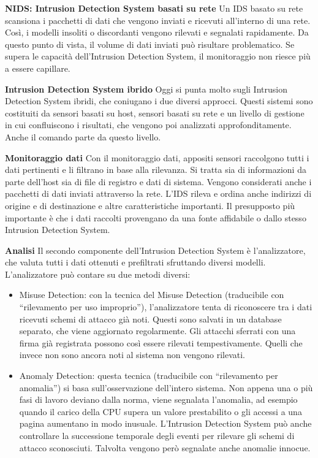 \textbf{NIDS: Intrusion Detection System basati su rete}
Un IDS basato su rete scansiona i pacchetti di dati che vengono inviati e ricevuti all’interno di una rete. Così, i modelli insoliti o discordanti vengono rilevati e segnalati rapidamente. Da questo punto di vista, il volume di dati inviati può risultare problematico. Se supera le capacità dell’Intrusion Detection System, il monitoraggio non riesce più a essere capillare.

\textbf{Intrusion Detection System ibrido}
Oggi si punta molto sugli Intrusion Detection System ibridi, che coniugano i due diversi approcci. Questi sistemi sono costituiti da sensori basati su host, sensori basati su rete e un livello di gestione in cui confluiscono i risultati, che vengono poi analizzati approfonditamente. Anche il comando parte da questo livello.



\textbf{Monitoraggio dati}
Con il monitoraggio dati, appositi sensori raccolgono tutti i dati pertinenti e li filtrano in base alla rilevanza. Si tratta sia di informazioni da parte dell’host sia di file di registro e dati di sistema. Vengono considerati anche i pacchetti di dati inviati attraverso la rete. L’IDS rileva e ordina anche indirizzi di origine e di destinazione e altre caratteristiche importanti. Il presupposto più importante è che i dati raccolti provengano da una fonte affidabile o dallo stesso Intrusion Detection System.

\textbf{Analisi}
Il secondo componente dell’Intrusion Detection System è l’analizzatore, che valuta tutti i dati ottenuti e prefiltrati sfruttando diversi modelli.
L’analizzatore può contare su due metodi diversi:
\begin{itemize}
    \item Misuse Detection: con la tecnica del Misuse Detection (traducibile con “rilevamento per uso improprio”), l’analizzatore tenta di riconoscere tra i dati ricevuti schemi di attacco già noti. Questi sono salvati in un database separato, che viene aggiornato regolarmente. Gli attacchi sferrati con una firma già registrata possono così essere rilevati tempestivamente. Quelli che invece non sono ancora noti al sistema non vengono rilevati.
    \item Anomaly Detection: questa tecnica (traducibile con “rilevamento per anomalia”) si basa sull’osservazione dell’intero sistema. Non appena una o più fasi di lavoro deviano dalla norma, viene segnalata l’anomalia, ad esempio quando il carico della CPU supera un valore prestabilito o gli accessi a una pagina aumentano in modo inusuale. L’Intrusion Detection System può anche controllare la successione temporale degli eventi per rilevare gli schemi di attacco sconosciuti. Talvolta vengono però segnalate anche anomalie innocue.
\end{itemize}

